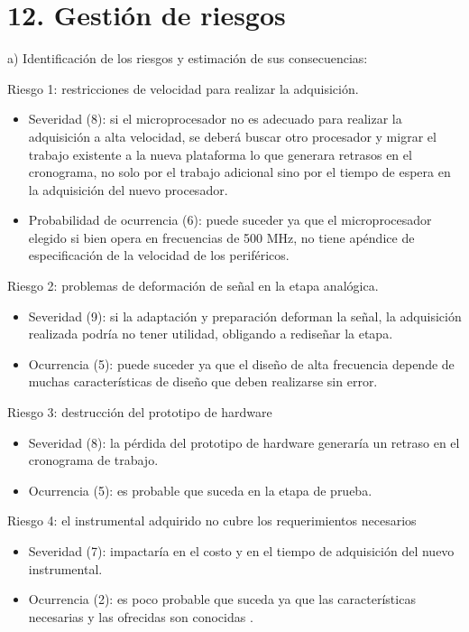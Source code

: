 \documentclass[11pt]{charter}
\begin{document}
\section{12. Gestión de riesgos}
\label{sec:riesgos}

a) Identificación de los riesgos y estimación de sus consecuencias:
 
Riesgo 1: restricciones de velocidad para realizar la adquisición. 
\begin{itemize}
\item Severidad (8): si el microprocesador no es adecuado para realizar la adquisición a alta velocidad, se deberá buscar otro procesador y migrar el trabajo existente a la nueva plataforma lo que generara retrasos en el cronograma, no solo por el trabajo adicional sino por el tiempo de espera en la adquisición del nuevo procesador.
\item Probabilidad de ocurrencia (6): puede suceder ya que el microprocesador elegido si bien opera en frecuencias de 500 MHz, no tiene apéndice de especificación de la velocidad de los periféricos. 
\end{itemize}   

Riesgo 2: problemas de deformación de señal en la etapa analógica.
\begin{itemize}
\item Severidad (9): si la adaptación y preparación deforman la señal, la adquisición realizada podría no tener utilidad, obligando a rediseñar la etapa.  
\item Ocurrencia (5): puede suceder ya que el diseño de alta frecuencia depende de muchas características de diseño que deben realizarse sin error.
\end{itemize}

Riesgo 3: destrucción del prototipo de hardware
\begin{itemize}
\item Severidad (8): la pérdida del prototipo de hardware generaría un retraso en el cronograma de trabajo.  
\item Ocurrencia (5): es probable que suceda en la etapa de prueba.  
\end{itemize}

Riesgo 4: el instrumental adquirido no cubre los requerimientos necesarios
\begin{itemize}
\item Severidad (7): impactaría en el costo y en el tiempo de adquisición del nuevo instrumental.  
\item Ocurrencia (2): es poco probable que suceda ya que las características necesarias y las ofrecidas son conocidas .  
\end{itemize}
\end{document}

